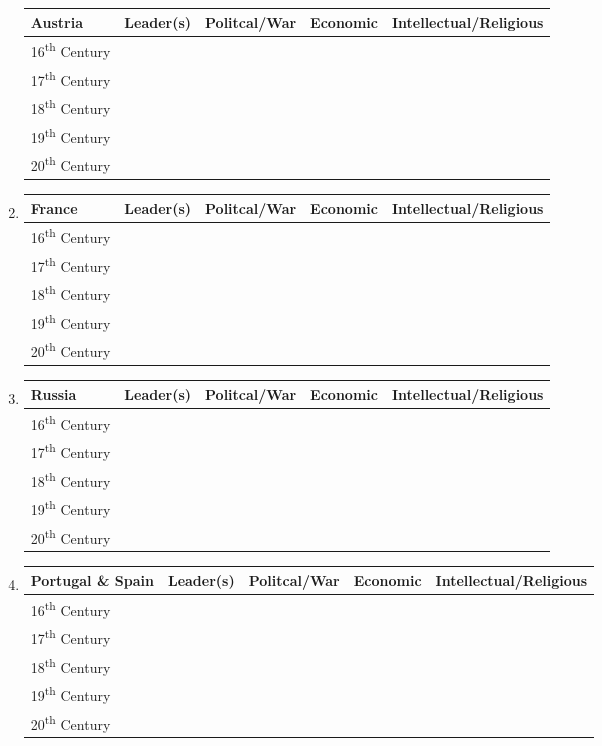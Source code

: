 \documentclass[12pt]{article}
\begin{document}
\begin{enumerate}
\begin{tabular}{l c c c c}
Austria & Leader(s) & Politcal/War & Economic & Intellectual/Religious \\
\hline
16\textsuperscript{th} Century & & & & \\
\hline
17\textsuperscript{th} Century & & & & \\
\hline
18\textsuperscript{th} Century & & & & \\
\hline
19\textsuperscript{th} Century & & & & \\
\hline
20\textsuperscript{th} Century & & & & \\

\end{tabular}

\item \begin{tabular}{l c c c c}

France & Leader(s) & Politcal/War & Economic & Intellectual/Religious \\
\hline
16\textsuperscript{th} Century & & & & \\
\hline
17\textsuperscript{th} Century & & & & \\
\hline
18\textsuperscript{th} Century & & & & \\
\hline
19\textsuperscript{th} Century & & & & \\
\hline
20\textsuperscript{th} Century & & & & \\

\end{tabular}

\item \begin{tabular}{l c c c c}

Russia & Leader(s) & Politcal/War & Economic & Intellectual/Religious \\
\hline
16\textsuperscript{th} Century & & & & \\
\hline
17\textsuperscript{th} Century & & & & \\
\hline
18\textsuperscript{th} Century & & & & \\
\hline
19\textsuperscript{th} Century & & & & \\
\hline
20\textsuperscript{th} Century & & & & \\

\end{tabular}

\item \begin{tabular}{l c c c c}

Portugal \& Spain & Leader(s) & Politcal/War & Economic & Intellectual/Religious \\
\hline
16\textsuperscript{th} Century & & & & \\
\hline
17\textsuperscript{th} Century & & & & \\
\hline
18\textsuperscript{th} Century & & & & \\
\hline
19\textsuperscript{th} Century & & & & \\
\hline
20\textsuperscript{th} Century & & & & \\


\end{tabular}
\end{enumerate}
\end{document}
